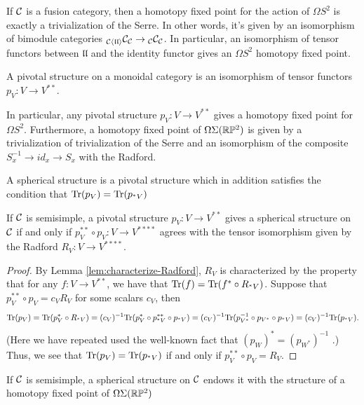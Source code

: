 \documentclass{amsart}
\begin{document}
If $\mathcal C$ is a fusion category, then a homotopy fixed point for the action of $\Omega S^2$ is exactly a trivialization of the Serre.  In other words, it's given by an isomorphism of bimodule categories ${}_{\mathcal C \langle \mathfrak{l l} \rangle} \mathcal C_\mathcal C \rightarrow {}_{\mathcal C} {\mathcal C}_{\mathcal C}$.  In particular, an isomorphism of tensor functors between $\mathfrak{l l}$ and the identity functor gives an $\Omega S^2$ homotopy fixed point.

\begin{definition}
A pivotal structure on a monoidal category is an isomorphism of tensor functors $p_V: V \rightarrow V^{**}$.   
\end{definition}

In particular, any pivotal structure $p_V: V \rightarrow V^{**}$  gives a homotopy fixed point for $\Omega S^2$.  Furthermore, a homotopy fixed point of $\Omega \Sigma (\mathbb R \mathbb P^2)$ is given by a trivialization of trivialization of the Serre and an isomorphism of the composite $S_{x}^{-1} \rightarrow id_x \rightarrow S_x$ with the Radford.  

\begin{definition}
A spherical structure is a pivotal structure which in addition satisfies the condition that $\mathrm{Tr}(p_V) = \mathrm{Tr}(p_{{}^*V})$
\end{definition}

\begin{lemma}
If $\mathcal C$ is semisimple, a pivotal structure $p_V: V \rightarrow V^{**}$ gives a spherical structure on $\mathcal C$ if and only if $p_V^{**} \circ p_V: V \rightarrow V^{****}$ agrees with the tensor isomorphism given by the Radford $R_V: V \rightarrow V^{****}$.
\end{lemma}
\begin{proof}
By Lemma \ref{lem:characterize-Radford}, $R_V$ is characterized by the property that for any $f: V \rightarrow V^{**}$, we have that $\mathrm{Tr}(f) = \mathrm{Tr}(f^* \circ R_{{}^*V})$.  Suppose that $p_V^{**} \circ p_V = c_V R_V$ for some scalars $c_V$, then
$$\mathrm{Tr}(p_V) = \mathrm{Tr}(p_V^* \circ R_{{}^*V}) = (c_V)^{-1}\mathrm{Tr}(p_V^* \circ p_{{}^*V}^{**} \circ p_{{}^*V}) = (c_V)^{-1}\mathrm{Tr}(p_{V^*}^{-1} \circ p_{V^*} \circ p_{{}^*V}) = (c_V)^{-1}\mathrm{Tr}(p_{{}^*V}).$$
(Here we have repeated used the well-known fact that $(p_W)^* = (p_{W^*})^{-1}$ \cite[Lemma 4.11]{0908.3347}.)  Thus, we see that $\mathrm{Tr}(p_V) = \mathrm{Tr}(p_{{}^*V})$ if and only if $p_V^{**} \circ p_V = R_V$.
\end{proof}

\begin{corollary}
If $\mathcal C$ is semisimple, a spherical structure on $\mathcal C$ endows it with the structure of a homotopy fixed point of $\Omega \Sigma (\mathbb R \mathbb P^2)$
\end{corollary}
\end{document}
